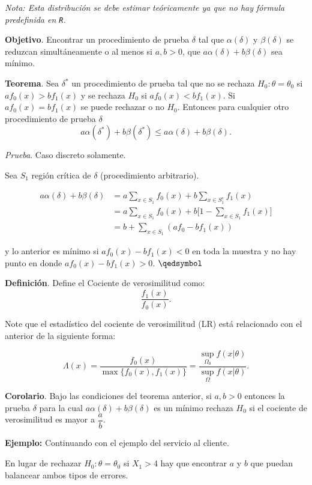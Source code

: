 \documentclass[
  12pt,
]{book}
\begin{document}
\emph{Nota: Esta distribución se debe estimar teóricamente ya que no hay fórmula
predefinida en \texttt{R}.}

\textbf{Objetivo}. Encontrar un procedimiento de prueba \(\delta\) tal que
\(\alpha(\delta)\) y \(\beta(\delta)\) se reduzcan simultáneamente o al menos si
\(a,b>0\), que \(a\alpha(\delta) + b\beta(\delta)\) sea mínimo.

\textbf{Teorema}. Sea \(\delta^*\) un procedimiento de prueba tal que no se rechaza
\(H_0:\theta=\theta_0\) si \(af_0(x) > bf_1(x)\) y se rechaza \(H_0\) si \(af_0(x) < bf_1(x)\). Si \(af_0(x) = bf_1(x)\) se puede rechazar o no \(H_0\). Entonces para
cualquier otro procedimiento de prueba \(\delta\) \[a\alpha(\delta^*) +
b\beta(\delta^*) \leq a\alpha(\delta) + b\beta(\delta). \]

\emph{Prueba}. Caso discreto solamente.

Sea \(S_1\) región crítica de \(\delta\) (procedimiento arbitrario).

\begin{align*}
a\alpha(\delta) + b\beta(\delta) & = a\sum_{x\in S_1}f_0(x) + b\sum_{x\in S_1^c}f_1(x) \\
& = a\sum_{x\in S_1}f_0(x) + b\bigg[1-\sum_{x\in S_1}f_1(x)\bigg]\\
& = b + \sum_{x\in S_1}(af_0-bf_1(x)) 
\end{align*}

y lo anterior es mínimo si \(af_0(x)-bf_1(x)<0\) en toda la muestra y no hay punto
en donde \(af_0(x)-bf_1(x)>0\). \(\qedsymbol\)

\textbf{Definición}. Define el Cociente de verosimilitud como:
\[\dfrac{f_1(x)}{f_0(x)}.\]

Note que el estadístico del cociente de verosimilitud (LR) está relacionado con
el anterior de la siguiente forma:

\[\Lambda(x) = \dfrac{f_0(x)}{\max\{f_0(x),f_1(x)\}} = \dfrac{\sup_{\Omega_0}f(x|\theta)}{\sup_{\Omega}f(x|\theta)}.\]

\textbf{Corolario}. Bajo las condiciones del teorema anterior, si \(a,b>0\) entonces la
prueba \(\delta\) para la cual \(a\alpha(\delta) + b\beta(\delta)\) es un mínimo
rechaza \(H_0\) si el cociente de verosimilitud es mayor a \(\dfrac ab\).

\textbf{Ejemplo:} Continuando con el ejemplo del servicio al cliente.

En lugar de rechazar \(H_0: \theta = \theta_0\) si \(X_1>4\) hay que encontrar \(a\) y
\(b\) que puedan balancear ambos tipos de errores.
\end{document}

